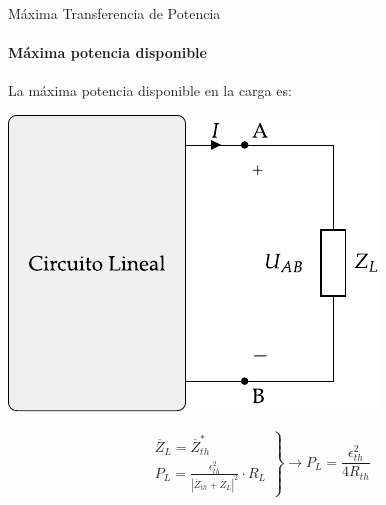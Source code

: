 \documentclass[aspectratio=169, usenames,svgnames,dvipsnames]{beamer}
\begin{document}
\begin{frame}[label={sec:orgcef1d7f}]{Máxima Transferencia de Potencia}
\framesubtitle{Máxima potencia disponible}

La máxima potencia disponible en la carga es:
\begin{center}
\includegraphics[height=0.45\textheight]{../figs/EquivalenteThevenin.pdf}
\end{center}

\begin{equation*}
  \left.
    \begin{matrix}
      \overline{Z}_L = \overline{Z}_{th}^*\\
      P_L = \frac{\epsilon^2_{th}}{|\overline{Z}_{th} + \overline{Z}_L|^2} \cdot R_L
    \end{matrix} \right\}\rightarrow
  \boxed{P_L = \frac{\epsilon^2_{th}}{4 R_{th}}}
\end{equation*}
\end{frame}
\end{document}
